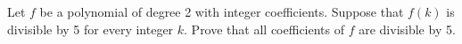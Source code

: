 Let \( f\) be a polynomial of degree 2 with integer coefficients. Suppose that \( f(k)\) is divisible by 5 for every integer \( k\). Prove that all coefficients of \( f\) are divisible by 5.